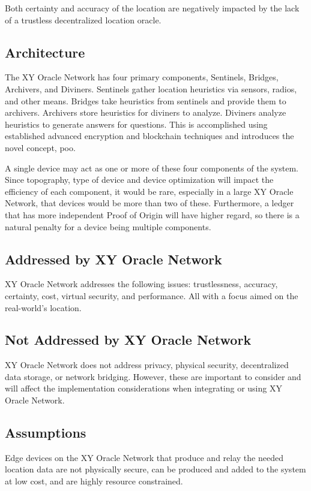 \documentclass{article}
\begin{document}
Both certainty and accuracy of the location are negatively impacted by the lack of a trustless decentralized location oracle.

\subsection {Architecture}
The XY Oracle Network has four primary components, Sentinels, Bridges, Archivers, and Diviners.  Sentinels gather location heuristics via sensors, radios, and other means.  Bridges take heuristics from sentinels and provide them to archivers.  Archivers store heuristics for diviners to analyze.  Diviners analyze heuristics to generate answers for questions.  This is accomplished using established advanced encryption and blockchain techniques and introduces the novel concept, \gls{poo}.

A single device may act as one or more of these four components of the system.  Since topography, type of device and device optimization will impact the efficiency of each component, it would be rare, especially in a large XY Oracle Network, that devices would be more than two of these.  Furthermore, a ledger that has more independent Proof of Origin will have higher regard, so there is a natural penalty for a device being multiple components.

\subsection {Addressed by XY Oracle Network}
XY Oracle Network addresses the following issues: trustlessness, accuracy, certainty, cost, virtual security, and performance. All with a focus aimed on the real-world's location.

\subsection {Not Addressed by XY Oracle Network}
XY Oracle Network does not address privacy, physical security, decentralized data storage, or network bridging.  However, these are important to consider and will affect the implementation considerations when integrating or using XY Oracle Network.

\subsection {Assumptions}
Edge devices on the XY Oracle Network that produce and relay the needed location data are not physically secure, can be produced and added to the system at low cost, and are highly resource constrained.
\end{document}
